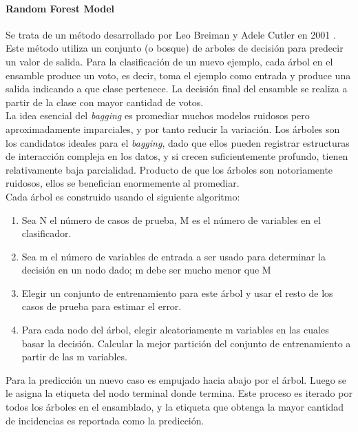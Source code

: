 \documentclass[../all.tex]{subfiles}
\begin{document}
        \newpage
    	\paragraph{Random Forest Model}
    	
	    	Se trata de un método desarrollado por Leo Breiman y Adele Cutler en 2001 . Este método utiliza un conjunto (o bosque) de arboles de decisión para predecir un valor de salida. Para la clasificación de un nuevo ejemplo, cada árbol en el ensamble produce un voto, es decir, toma el ejemplo como entrada y produce una salida indicando a que clase pertenece. La decisión final del ensamble se realiza a partir de la clase con mayor cantidad de votos.\\
	    	
	    	La idea esencial del \textit{bagging} es promediar muchos modelos ruidosos pero aproximadamente imparciales, y por tanto reducir la variación. Los árboles son los candidatos ideales para el \textit{bagging}, dado que ellos pueden registrar estructuras de interacción compleja en los datos, y si crecen suficientemente profundo, tienen relativamente baja parcialidad. Producto de que los árboles son notoriamente ruidosos, ellos se benefician enormemente al promediar.\\
	    	
	    	Cada árbol es construido usando el siguiente algoritmo\cite{RandomForestModel}:
	    	\begin{enumerate}[resume]
	    		\setcounter{enumi}{0}
		    	\item Sea N el número de casos de prueba, M es el número de variables en el clasificador.
		    	\item Sea m el número de variables de entrada a ser usado para determinar la decisión en un nodo dado; m debe ser mucho menor que M
		    	\item Elegir un conjunto de entrenamiento para este árbol y usar el resto de los casos de prueba para estimar el error.
		    	\item Para cada nodo del árbol, elegir aleatoriamente m variables en las cuales basar la decisión. Calcular la mejor partición del conjunto de entrenamiento a partir de las m variables.
	        \end{enumerate}
        
        	Para la predicción un nuevo caso es empujado hacia abajo por el árbol. Luego se le asigna la etiqueta del nodo terminal donde termina. Este proceso es iterado por todos los árboles en el ensamblado, y la etiqueta que obtenga la mayor cantidad de incidencias es reportada como la predicción.
  		\newpage
\end{document}
